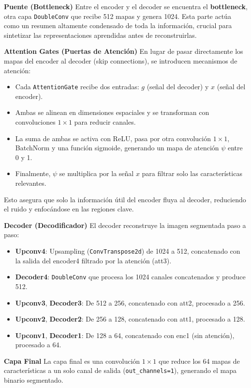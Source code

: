 \begin{enumerate}
\begin{itemize}
\textbf{Puente (Bottleneck)}
Entre el encoder y el decoder se encuentra el \textbf{bottleneck}, otra capa \texttt{DoubleConv} que recibe 512 mapas y genera 1024. Esta parte actúa como un resumen altamente condensado de toda la información, crucial para sintetizar las representaciones aprendidas antes de reconstruirlas.

\textbf{Attention Gates (Puertas de Atención)}
En lugar de pasar directamente los mapas del encoder al decoder (skip connections), se introducen mecanismos de atención:
\begin{itemize}
    \item Cada \texttt{AttentionGate} recibe dos entradas: $g$ (señal del decoder) y $x$ (señal del encoder).
    \item Ambas se alinean en dimensiones espaciales y se transforman con convoluciones $1\times1$ para reducir canales.
    \item La suma de ambas se activa con ReLU, pasa por otra convolución $1\times1$, BatchNorm y una función sigmoide, generando un mapa de atención $\psi$ entre 0 y 1.
    \item Finalmente, $\psi$ se multiplica por la señal $x$ para filtrar solo las características relevantes.
\end{itemize}
Esto asegura que solo la información útil del encoder fluya al decoder, reduciendo el ruido y enfocándose en las regiones clave.

\textbf{Decoder (Decodificador)}
El decoder reconstruye la imagen segmentada paso a paso:
\begin{itemize}
    \item \textbf{Upconv4}: Upsampling (\texttt{ConvTranspose2d}) de 1024 a 512, concatenado con la salida del encoder4 filtrado por la atención (att3).
    \item \textbf{Decoder4}: \texttt{DoubleConv} que procesa los 1024 canales concatenados y produce 512.
    \item \textbf{Upconv3}, \textbf{Decoder3}: De 512 a 256, concatenado con att2, procesado a 256.
    \item \textbf{Upconv2}, \textbf{Decoder2}: De 256 a 128, concatenado con att1, procesado a 128.
    \item \textbf{Upconv1}, \textbf{Decoder1}: De 128 a 64, concatenado con enc1 (sin atención), procesado a 64.
\end{itemize}

\textbf{Capa Final}
La capa final es una convolución $1\times1$ que reduce los 64 mapas de características a un solo canal de salida (\texttt{out\_channels=1}), generando el mapa binario segmentado.


\end{itemize}
\end{enumerate}
